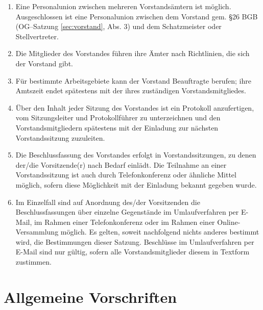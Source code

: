 \documentclass[%
12pt, %
a4paper, %
headsepline, %
parskip, %
headings=normal, %
]{scrreprt}
\begin{document}
\begin{enumerate}
    \item Eine Personalunion zwischen mehreren Vorstandsämtern ist möglich. Ausgeschlossen ist eine Personalunion zwischen dem Vorstand gem. \S 26 BGB (OG--Satzung \ref{sec:vorstand}, Abs. 3) und dem Schatzmeister oder Stellvertreter.
    \item Die Mitglieder des Vorstandes führen ihre Ämter nach Richtlinien, die sich der Vorstand gibt.
    \item Für bestimmte Arbeitsgebiete kann der Vorstand Beauftragte berufen; ihre Amtszeit endet spätestens mit der ihres zuständigen Vorstandsmitgliedes.
    \item Über den Inhalt jeder Sitzung des Vorstandes ist ein Protokoll anzufertigen, vom Sitzungsleiter und Protokollführer zu unterzeichnen und den Vorstandsmitgliedern spätestens mit der Einladung zur nächsten Vorstandssitzung zuzuleiten.
    \item Die Beschlussfassung des Vorstandes erfolgt in Vorstandssitzungen, zu denen der/die Vorsitzende(r) nach Bedarf einlädt. Die Teilnahme an einer Vorstandssitzung ist auch durch Telefonkonferenz oder ähnliche Mittel möglich, sofern diese Möglichkeit mit der Einladung bekannt gegeben wurde.
    \item Im Einzelfall sind auf Anordnung des/der Vorsitzenden die Beschlussfassungen über einzelne Gegenstände im Umlaufverfahren per E-Mail, im Rahmen einer Telefonkonferenz oder im Rahmen einer Online-Versammlung möglich. Es gelten, soweit nachfolgend nichts anderes bestimmt wird, die Bestimmungen dieser Satzung. Beschlüsse im Umlaufverfahren per E-Mail sind nur gültig, sofern alle Vorstandsmitglieder diesem in Textform zustimmen.
\end{enumerate}

\chapter{Allgemeine Vorschriften}
\setcounter{section}{7}
\end{document}
